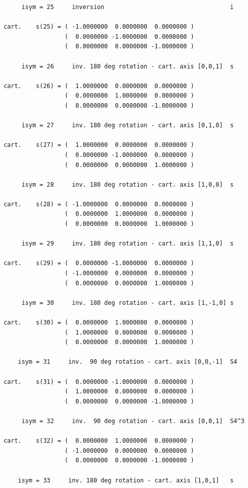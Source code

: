 \documentclass[12pt,a4paper]{article}
\begin{document}
\begin{verbatim}
      isym = 25     inversion                                   i

 cart.    s(25) = ( -1.0000000  0.0000000  0.0000000 )
                  (  0.0000000 -1.0000000  0.0000000 )
                  (  0.0000000  0.0000000 -1.0000000 )

      isym = 26     inv. 180 deg rotation - cart. axis [0,0,1]  s

 cart.    s(26) = (  1.0000000  0.0000000  0.0000000 )
                  (  0.0000000  1.0000000  0.0000000 )
                  (  0.0000000  0.0000000 -1.0000000 )

      isym = 27     inv. 180 deg rotation - cart. axis [0,1,0]  s

 cart.    s(27) = (  1.0000000  0.0000000  0.0000000 )
                  (  0.0000000 -1.0000000  0.0000000 )
                  (  0.0000000  0.0000000  1.0000000 )

      isym = 28     inv. 180 deg rotation - cart. axis [1,0,0]  s

 cart.    s(28) = ( -1.0000000  0.0000000  0.0000000 )
                  (  0.0000000  1.0000000  0.0000000 )
                  (  0.0000000  0.0000000  1.0000000 )

      isym = 29     inv. 180 deg rotation - cart. axis [1,1,0]  s

 cart.    s(29) = (  0.0000000 -1.0000000  0.0000000 )
                  ( -1.0000000  0.0000000  0.0000000 )
                  (  0.0000000  0.0000000  1.0000000 )

      isym = 30     inv. 180 deg rotation - cart. axis [1,-1,0] s

 cart.    s(30) = (  0.0000000  1.0000000  0.0000000 )
                  (  1.0000000  0.0000000  0.0000000 )
                  (  0.0000000  0.0000000  1.0000000 )

     isym = 31     inv.  90 deg rotation - cart. axis [0,0,-1]  S4

 cart.    s(31) = (  0.0000000 -1.0000000  0.0000000 )
                  (  1.0000000  0.0000000  0.0000000 )
                  (  0.0000000  0.0000000 -1.0000000 )

      isym = 32     inv.  90 deg rotation - cart. axis [0,0,1]  S4^3

 cart.    s(32) = (  0.0000000  1.0000000  0.0000000 )
                  ( -1.0000000  0.0000000  0.0000000 )
                  (  0.0000000  0.0000000 -1.0000000 )

     isym = 33     inv. 180 deg rotation - cart. axis [1,0,1]   s


\end{verbatim}
\end{document}

